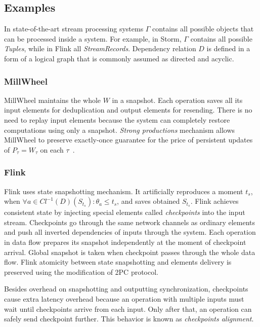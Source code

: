 \subsection{Examples}

In state-of-the-art stream processing systems $\Gamma$ contains all possible objects that can be processed inside a system. For example, in Storm, $\Gamma$ contains all possible {\em Tuples}, while in Flink all {\em StreamRecords}. Dependency relation $D$ is defined in a form of a logical graph that is commonly assumed as directed and acyclic.

\subsubsection{MillWheel}

MillWheel maintains the whole $W$ in a snapshot. Each operation saves all its input elements for deduplication and output elements for resending. There is no need to replay input elements because the system can completely restore computations using only a snapshot. {\em Strong productions} mechanism allows MillWheel to preserve exactly-once guarantee for the price of persistent updates of $P_\tau=W_\tau$ on each $\tau$~\cite{Akidau:2013:MFS:2536222.2536229}.    

\subsubsection{Flink}

Flink uses state snapshotting mechanism. It artificially reproduces a moment $t_s$, when $\forall{a}\in{Cl^{-1}(D)(S_{t_s})}:\theta_a \leq t_s$, and saves obtained $S_{t_s}$. Flink achieves consistent state by injecting special elements called {\em checkpoints} into the input stream. Checkpoints go through the same network channels as ordinary elements and push all inverted dependencies of inputs through the system. Each operation in data flow prepares its snapshot independently at the moment of checkpoint arrival. Global snapshot is taken when checkpoint passes through the whole data flow. Flink atomicity between state snapshotting and elements delivery is preserved using the modification of 2PC protocol.

Besides overhead on snapshotting and outputting synchronization, checkpoints cause extra latency overhead because an operation with multiple inputs must wait until checkpoints arrive from each input. Only after that, an operation can safely send checkpoint further. This behavior is known as {\em checkpoints alignment}.

